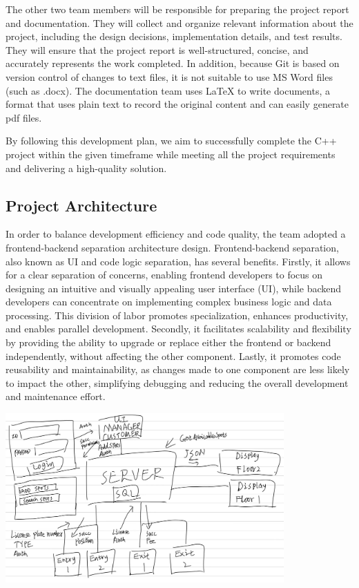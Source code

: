 {{\begin{enumerate}
			The other two team members will be responsible for preparing the
			project report and documentation. They will collect and organize
			relevant information about the project, including the design
			decisions, implementation details, and test results. They will ensure
			that the project report is well-structured, concise, and accurately
			represents the work completed. In addition, because Git is based on
			version control of changes to text files, it is not suitable to use
			MS Word files (such as .docx). The documentation team uses \LaTeX
			to write documents, a format that uses plain text to record the
			original content and can easily generate pdf files.
		\end{enumerate}
		
		By following this development plan, we aim to successfully complete the
		C++ project within the given timeframe while meeting all the project
		requirements and delivering a high-quality solution.
	
		\hypertarget{project-architecture}{%
			\subsection{Project Architecture}\label{project-architecture}}
		
		In order to balance development efficiency and code quality, the team
		adopted a frontend-backend separation architecture design.
		Frontend-backend separation, also known as UI and code logic separation,
		has several benefits. Firstly, it allows for a clear separation of
		concerns, enabling frontend developers to focus on designing an
		intuitive and visually appealing user interface (UI), while backend
		developers can concentrate on implementing complex business logic and
		data processing. This division of labor promotes specialization,
		enhances productivity, and enables parallel development. Secondly, it
		facilitates scalability and flexibility by providing the ability to
		upgrade or replace either the frontend or backend independently, without
		affecting the other component. Lastly, it promotes code reusability and
		maintainability, as changes made to one component are less likely to
		impact the other, simplifying debugging and reducing the overall
		development and maintenance effort.
		\begin{center}
			\centering
			\includegraphics[width=0.8\textwidth]{pics/1.png}
		\end{center}
		
}}
